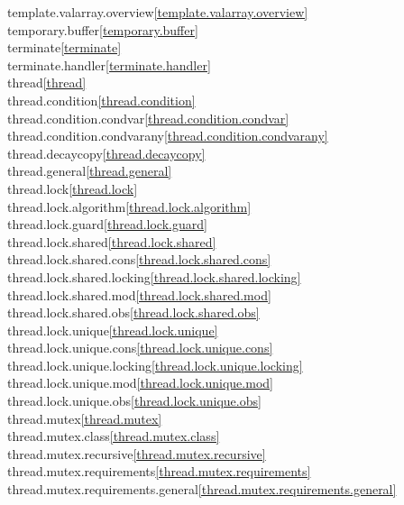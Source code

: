 \begin{multicols}{2}
template.valarray.overview\quad\ref{template.valarray.overview}\\
temporary.buffer\quad\ref{temporary.buffer}\\
terminate\quad\ref{terminate}\\
terminate.handler\quad\ref{terminate.handler}\\
thread\quad\ref{thread}\\
thread.condition\quad\ref{thread.condition}\\
thread.condition.condvar\quad\ref{thread.condition.condvar}\\
thread.condition.condvarany\quad\ref{thread.condition.condvarany}\\
thread.decaycopy\quad\ref{thread.decaycopy}\\
thread.general\quad\ref{thread.general}\\
thread.lock\quad\ref{thread.lock}\\
thread.lock.algorithm\quad\ref{thread.lock.algorithm}\\
thread.lock.guard\quad\ref{thread.lock.guard}\\
thread.lock.shared\quad\ref{thread.lock.shared}\\
thread.lock.shared.cons\quad\ref{thread.lock.shared.cons}\\
thread.lock.shared.locking\quad\ref{thread.lock.shared.locking}\\
thread.lock.shared.mod\quad\ref{thread.lock.shared.mod}\\
thread.lock.shared.obs\quad\ref{thread.lock.shared.obs}\\
thread.lock.unique\quad\ref{thread.lock.unique}\\
thread.lock.unique.cons\quad\ref{thread.lock.unique.cons}\\
thread.lock.unique.locking\quad\ref{thread.lock.unique.locking}\\
thread.lock.unique.mod\quad\ref{thread.lock.unique.mod}\\
thread.lock.unique.obs\quad\ref{thread.lock.unique.obs}\\
thread.mutex\quad\ref{thread.mutex}\\
thread.mutex.class\quad\ref{thread.mutex.class}\\
thread.mutex.recursive\quad\ref{thread.mutex.recursive}\\
thread.mutex.requirements\quad\ref{thread.mutex.requirements}\\
thread.mutex.requirements.general\quad\ref{thread.mutex.requirements.general}\\

\end{multicols}
